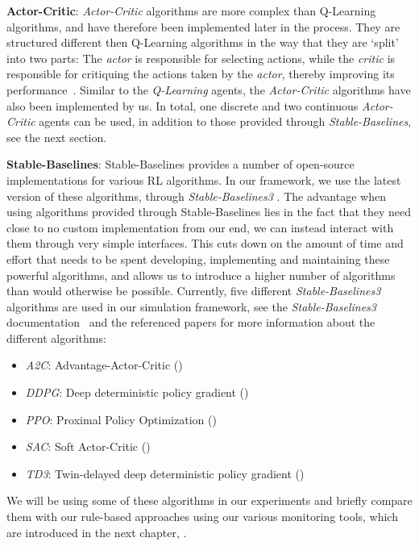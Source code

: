 \medskip
\noindent\textbf{Actor-Critic}:\label{item:ActorCritic} \emph{Actor-Critic} algorithms are more complex than Q-Learning algorithms, and have therefore been implemented later in the process. They are structured different then Q-Learning algorithms in the way that they are `split' into two parts: The \emph{actor} is responsible for selecting actions, while the \emph{critic} is responsible for critiquing  the actions taken by the \emph{actor}, thereby improving its performance~\cite{ActorCritic}. Similar to the \emph{Q-Learning} agents, the \emph{Actor-Critic} algorithms have also been implemented by us. In total, one discrete and two continuous \emph{Actor-Critic} agents can be used, in addition to those provided through \emph{Stable-Baselines}, see the next section.

\medskip
\noindent\textbf{Stable-Baselines}:\label{item:StableBaselines} Stable-Baselines provides a number of open-source implementations for various RL algorithms. In our framework, we use the latest version of these algorithms, through \emph{Stable-Baselines3} \cite{StableBaselines3}. The advantage when using algorithms provided through Stable-Baselines lies in the fact that they need close to no custom implementation from our end, we can instead interact with them through very simple interfaces. This cuts down on the amount of time and effort that needs to be spent developing, implementing and maintaining these powerful algorithms, and allows us to introduce a higher number of algorithms than would otherwise be possible. Currently, five different \emph{Stable-Baselines3} algorithms are used in our simulation framework, see the \emph{Stable-Baselines3} documentation~\cite{StableBaselines3Algorithms} and the referenced papers for more information about the different algorithms:
\begin{itemize}
	\item \emph{A2C}: Advantage-Actor-Critic (\cite{StableBaselines3A2C})
	\item \emph{DDPG}: Deep deterministic policy gradient (\cite{StableBaselines3DDPG})
	\item \emph{PPO}: Proximal Policy Optimization (\cite{StableBaselines3PPO})
	\item \emph{SAC}: Soft Actor-Critic (\cite{StableBaselines3SAC})
	\item \emph{TD3}: Twin-delayed deep deterministic policy gradient (\cite{StableBaselines3TD3})
\end{itemize}
We will be using some of these algorithms in our experiments and briefly compare them with our rule-based approaches using our various monitoring tools, which are introduced in the next chapter, .

